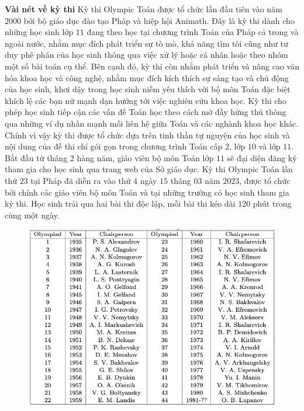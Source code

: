 \begin{multicols}{2}
	\textbf{\color{cackithi}Vài nét về kỳ thi}
	\vskip 0.1cm 
	Kỳ thi Olympic Toán được tổ chức lần đầu tiên vào năm $2000$ bởi bộ giáo dục đào tạo Pháp và hiệp hội Animath. Đây là kỳ thi dành cho những học sinh lớp $11$ đang theo học tại chương trình Toán của Pháp cả trong và ngoài nước, nhằm mục đích phát triển sự tò mò, khả năng tìm tòi cũng như tư duy phê phán của học sinh thông qua việc xử lý hoặc cá nhân hoặc theo nhóm một số bài toán cụ thể. Bên cạnh đó, kỳ thi còn nhằm phát triển và nâng cao văn hóa khoa học và công nghệ, nhằm mục đích kích thích sự sáng tạo và chủ động của học sinh, khơi dậy trong học sinh niềm yêu thích với bộ môn Toán đặc biệt khích lệ các bạn nữ mạnh dạn hướng tới việc nghiên cứu khoa học. Kỳ thi cho phép học sinh tiếp cận các vấn đề Toán học theo cách mở đầy hứng thú thông qua những ví dụ nhấn mạnh mối liên hệ giữa Toán và các nghành khoa học khác. Chính vì vậy kỳ thi được tổ chức dựa trên tinh thần tự nguyện của học sinh và nội dung của đề thi chỉ gói gọn trong chương trình Toán cấp $2$, lớp $10$ và lớp $11$. 
	\vskip 0.1cm
	Bắt đầu từ tháng $2$ hàng năm, giáo viên bộ môn Toán lớp $11$ sẽ đại diện đăng ký tham gia cho học sinh qua trang web của Sở giáo dục. Kỳ thi Olympic Toán lần thứ $23$ tại Pháp đã diễn ra vào thứ $4$ ngày $15$ tháng $03$ năm $2023$, được tổ chức bởi chính các giáo viên bộ môn Toán và tại những trường có học sinh tham gia kỳ thi. Học sinh trải qua hai bài thi độc lập, mỗi bài thi kéo dài $120$ phút trong cùng một ngày. 
	\begin{figure}[H]
		\vspace*{-10pt}
		\centering
		\captionsetup{labelformat= empty, justification=centering}
		\includegraphics[width= 1\linewidth]{1}

\end{figure}
\end{multicols}
